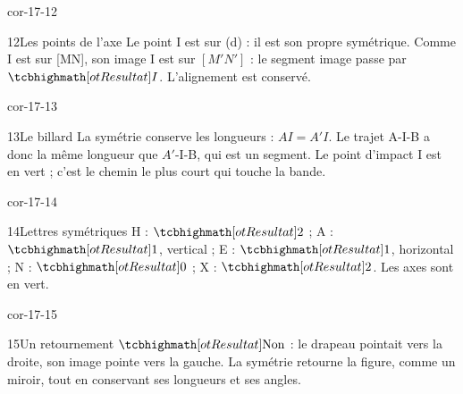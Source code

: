 \begin{blocLivre}{cor-17-12}\begin{corrige}{12}{Les points de l’axe}
Le point I est sur (d) : il est son propre symétrique. Comme I est sur [MN], son image I est sur $[M'N']$ : le segment image passe par $\res I$. L’alignement est conservé.
\label{fig-cor-17-12}
\end{corrige}\end{blocLivre}
\begin{blocLivre}{cor-17-13}\begin{corrige}{13}{Le billard}
La symétrie conserve les longueurs : $AI=A'I$. Le trajet A-I-B a donc la même longueur que $A'$-I-B, qui est un segment. Le point d’impact I est en vert ; c’est le chemin le plus court qui touche la bande.
\label{fig-cor-17-13}
\end{corrige}\end{blocLivre}
\begin{blocLivre}{cor-17-14}\begin{corrige}{14}{Lettres symétriques}
H : $\res2$ ; A : $\res1$, vertical ; E : $\res1$, horizontal ; N : $\res0$ ; X : $\res2$. Les axes sont en vert.
\label{fig-cor-17-14}
\end{corrige}\end{blocLivre}
\begin{blocLivre}{cor-17-15}\begin{corrige}{15}{Un retournement}
$\res{\text{Non}}$ : le drapeau pointait vers la droite, son image pointe vers la gauche. La symétrie retourne la figure, comme un miroir, tout en conservant ses longueurs et ses angles.
\label{fig-cor-17-15}
\end{corrige}\end{blocLivre}

